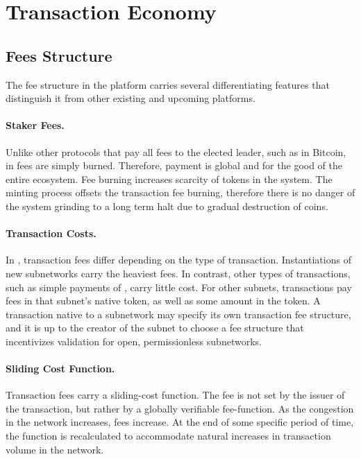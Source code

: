\documentclass[runningheads]{llncs}
\begin{document}
\section{Transaction Economy}
\subsection{Fees Structure}
The fee structure in the \AVAPlatformName{} platform carries several differentiating features that distinguish it from other existing and upcoming platforms. 

\paragraph{Staker Fees.} Unlike other protocols that pay all fees to the elected leader, such as in Bitcoin, in \AVAPlatformName{} fees are simply burned. 
Therefore, payment is global and for the good of the entire ecosystem. Fee burning increases scarcity of tokens in the system. The minting process offsets the transaction fee burning, therefore there is no danger of the system grinding to a long term halt due to gradual destruction of coins. 
\paragraph{Transaction Costs.} In \AVAPlatformName{}, transaction fees differ depending on the type of transaction. 
Instantiations of new subnetworks carry the heaviest fees. 
In contrast, other types of transactions, such as simple payments of \AVATokenName{}, carry little cost. 
For other subnets, transactions pay fees in that subnet's native token, as well as some amount in the \AVATokenName{} token. 
A transaction native to a subnetwork may specify its own transaction fee structure, and it is up to the creator of the subnet to choose a fee structure that incentivizes validation for open, permissionless subnetworks.
\paragraph{Sliding Cost Function.} Transaction fees carry a sliding-cost function. 
The fee is not set by the issuer of the transaction, but rather by a globally verifiable fee-function. 
As the congestion in the network increases, fees increase. 
At the end of some specific period of time, the function is recalculated to accommodate natural increases in transaction volume in the network.
\end{document}
